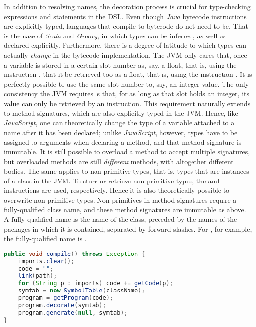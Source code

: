 In addition to resolving names, the decoration process is crucial for type-checking expressions and statements in the DSL. Even though \emph{Java} bytecode instructions are explicitly typed, languages that compile to bytecode do not need to be. That is the case of \emph{Scala} and \emph{Groovy}, in which types can be inferred, as well as declared explicitly. Furthermore, there is a degree of latitude to which types can actually \emph{change} in the bytecode implementation. The JVM only cares that, once a variable is stored in a certain slot number as, say, a float, that is, using the instruction , that it be retrieved too as a float, that is, using the instruction . It is perfectly possible to use the same slot number to, say,  an integer value. The only consistency the JVM requires is that, for as long as that slot holds an integer, its value can only be retrieved by an  instruction. This requirement naturally extends to method signatures, which are also explicitly typed in the JVM. Hence, like \emph{JavaScript}, one can theoretically change the type of a variable attached to a name after it has been declared; unlike \emph{JavaScript}, however, types have to be assigned to arguments when declaring a method, and that method signature is immutable. It is still possible to overload a method to accept multiple signatures, but overloaded methods are still \emph{different} methods, with altogether different bodies. The same applies to non-primitive types, that is, types that are instances of a class in the JVM. To store or retrieve non-primitive types, the  and  instructions are used, respectively. Hence it is also theoretically possible to overwrite non-primitive types. Non-primitives in method signatures require a fully-qualified class name, and these method signatures are immutable as above. A fully-qualified name is the name of the class, preceded by the names of the packages in which it is contained, separated by forward slashes. For , for example, the fully-qualified name is .

\begin{lstlisting}[language=Java,caption={Triggering the compilation process of a \emph{Scandal} program.},label={alg:compile}]
public void compile() throws Exception {
	imports.clear();
	code = "";
	link(path);
	for (String p : imports) code += getCode(p);
	symtab = new SymbolTable(className);
	program = getProgram(code);
	program.decorate(symtab);
	program.generate(null, symtab);
}
\end{lstlisting}

